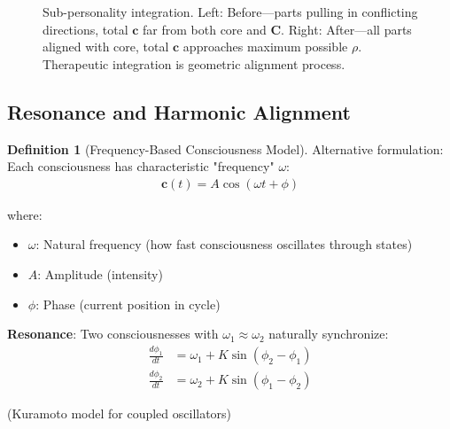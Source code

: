\documentclass[11pt,a4paper]{article}
\theoremstyle{definition}
\newtheorem{definition}{Definition}[section]
\theoremstyle{remark}
\newcommand{\cc}{\mathbf{c}}
\begin{document}
\begin{enumerate}
\begin{figure}[H]
\caption{Sub-personality integration. Left: Before—parts pulling in conflicting directions, total \(\cc\) far from both core and \(\mathbf{C}\). Right: After—all parts aligned with core, total \(\cc\) approaches maximum possible \(\rho\). Therapeutic integration is geometric alignment process.}
\label{fig:subpersonality_integration}
\end{figure}

\subsection{Resonance and Harmonic Alignment}

\begin{definition}[Frequency-Based Consciousness Model]
Alternative formulation: Each consciousness has characteristic "frequency" \(\omega\):
\begin{align}
\cc(t) = A \cos(\omega t + \phi)
\end{align}

where:
\begin{itemize}
    \item \(\omega\): Natural frequency (how fast consciousness oscillates through states)
    \item \(A\): Amplitude (intensity)
    \item \(\phi\): Phase (current position in cycle)
\end{itemize}

\textbf{Resonance}: Two consciousnesses with \(\omega_1 \approx \omega_2\) naturally synchronize:
\begin{align}
\frac{d\phi_1}{dt} &= \omega_1 + K\sin(\phi_2 - \phi_1) \\
\frac{d\phi_2}{dt} &= \omega_2 + K\sin(\phi_1 - \phi_2)
\end{align}

(Kuramoto model for coupled oscillators)


\end{definition}
\end{enumerate}
\end{document}
